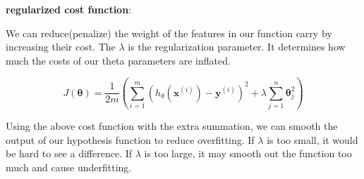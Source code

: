 \documentclass{article}
\begin{document}
\noindent \textbf{regularized cost function}:

\noindent We can reduce(penalize) the weight of the features in our function carry by increasing their cost. The \(\lambda\) is the regularization parameter. It determines how much the costs of our theta parameters are inflated. 

\[J(\boldsymbol{\theta}) = \frac{1}{2m} (\sum_{i = 1}^m (h_{\theta}(\textbf{x}^{(i)}) - \textbf{y}^{(i)})^2 + \lambda \sum_{j = 1}^n \boldsymbol{\theta}_j^2)\]

\noindent Using the above cost function with the extra summation, we can smooth the output of our hypothesis function to reduce overfitting. If \(\lambda\) is too small, it would be hard to see a difference. If \(\lambda\) is too large, it may smooth out the function too much and cause underfitting.

\printindex
\end{document}
